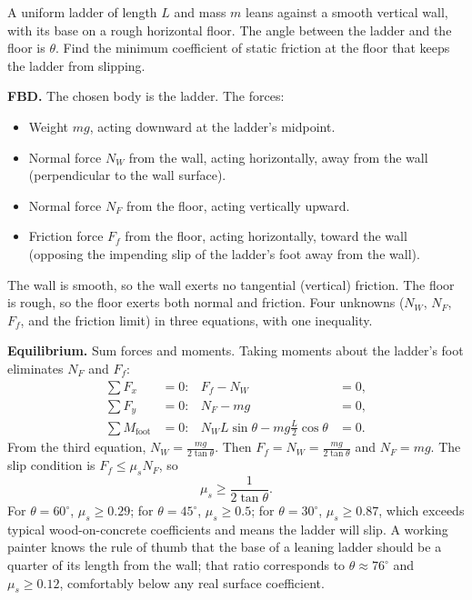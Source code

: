 

A uniform ladder of length $L$ and mass $m$ leans against a smooth
vertical wall, with its base on a rough horizontal floor. The angle
between the ladder and the floor is $\theta$. Find the minimum
coefficient of static friction at the floor that keeps the ladder from
slipping.

\textbf{FBD.} The chosen body is the ladder. The forces:

\begin{itemize}[leftmargin=*]
  \item Weight $mg$, acting downward at the ladder's midpoint.
  \item Normal force $N_W$ from the wall, acting horizontally, away
    from the wall (perpendicular to the wall surface).
  \item Normal force $N_F$ from the floor, acting vertically upward.
  \item Friction force $F_f$ from the floor, acting horizontally,
    toward the wall (opposing the impending slip of the ladder's foot
    away from the wall).
\end{itemize}

The wall is smooth, so the wall exerts no tangential (vertical)
friction. The floor is rough, so the floor exerts both normal and
friction. Four unknowns ($N_W$, $N_F$, $F_f$, and the friction limit)
in three equations, with one inequality.

\textbf{Equilibrium.} Sum forces and moments. Taking moments about the
ladder's foot eliminates $N_F$ and $F_f$:
\begin{align*}
\sum F_x &= 0: & F_f - N_W &= 0, \\
\sum F_y &= 0: & N_F - mg &= 0, \\
\sum M_{\text{foot}} &= 0: & N_W L \sin\theta - mg \frac{L}{2}
\cos\theta &= 0.
\end{align*}
From the third equation, $N_W = \frac{mg}{2 \tan\theta}$. Then
$F_f = N_W = \frac{mg}{2 \tan\theta}$ and $N_F = mg$. The slip
condition is $F_f \le \mu_s N_F$, so
\[
\mu_s \ge \frac{1}{2 \tan\theta}.
\]
For $\theta = 60^{\circ}$, $\mu_s \ge 0.29$; for $\theta =
45^{\circ}$, $\mu_s \ge 0.5$; for $\theta = 30^{\circ}$, $\mu_s \ge
0.87$, which exceeds typical wood-on-concrete coefficients and means
the ladder will slip. A working painter knows the rule of thumb that
the base of a leaning ladder should be a quarter of its length from
the wall; that ratio corresponds to $\theta \approx 76^{\circ}$ and
$\mu_s \ge 0.12$, comfortably below any real surface coefficient.

